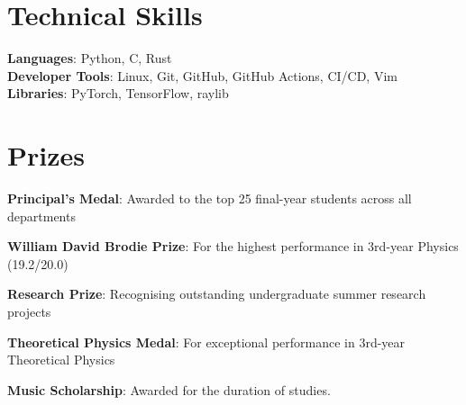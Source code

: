 \documentclass[letterpaper,11pt]{article}
\begin{document}
%
\section{Technical Skills}
\begin{itemize}[leftmargin=0.15in, label={}]
  \small{\item{
                \textbf{Languages}{: Python, C, Rust} \\
                \textbf{Developer Tools}{: Linux, Git, GitHub, GitHub Actions, CI/CD, Vim } \\
                \textbf{Libraries}{: PyTorch, TensorFlow, raylib}
          }}
\end{itemize}
\section{Prizes}
\begin{itemize}[leftmargin=0.30in]
  \small{
  \item \textbf{Principal's Medal}: Awarded to the top 25 final-year students across all departments
        \vspace{-0.3cm}
  \item \textbf{William David Brodie Prize}: For the highest performance in 3rd-year Physics (19.2/20.0)

        \vspace{-0.3cm}
  \item \textbf{Research Prize}: Recognising outstanding undergraduate summer research projects
        }
        \vspace{-0.3cm}
  \item \textbf{Theoretical Physics Medal}: For exceptional performance in 3rd-year Theoretical Physics
        \vspace{-0.3cm}
  \item \textbf{Music Scholarship}: Awarded for the duration of studies.
\end{itemize}




\end{document}
